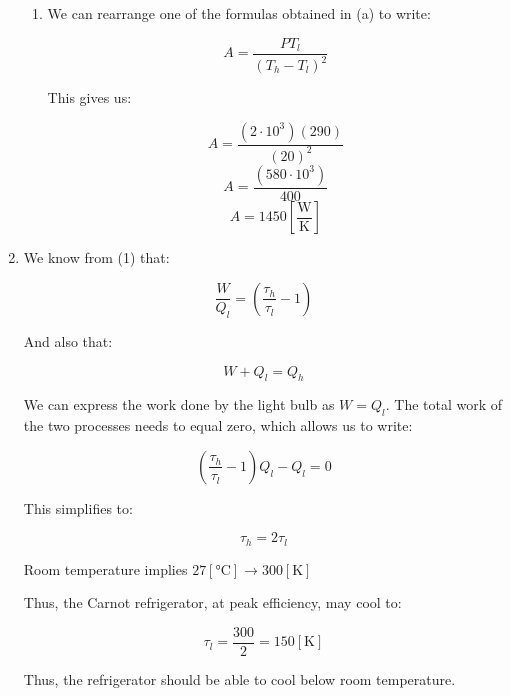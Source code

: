 \begin{enumerate}
\begin{enumerate}
      \item 

        We can rearrange one of the formulas obtained in (a) to write:

        $$A=\frac{PT_l}{\left( T_h-T_l \right)^2}$$

        This gives us:

        $$A=\frac{(2\cdot10^3)(290)}{(20)^2}$$
        $$A=\frac{(580\cdot10^3)}{400}$$
        $$\boxed{A=1450\left[ \frac{\si{\watt}}{\si{\kelvin}} \right]}$$

    \end{enumerate}

  \item

    We know from (1) that:

    $$\frac{W}{Q_l}=\left( \frac{\tau_h}{\tau_l}-1 \right)$$

    And also that:

    $$W+Q_l=Q_h$$

    We can express the work done by the light bulb as $W=Q_l$. The total work of the two processes needs to equal zero, which allows us to write:

    $$\left( \frac{\tau_h}{\tau_l}-1 \right)Q_l-Q_l=0$$

    This simplifies to:

    $$\tau_h=2\tau_l$$

    Room temperature implies $27[\si{\celsius}]\to300[\si{\kelvin}]$

    Thus, the Carnot refrigerator, at peak efficiency, may cool to:

    $$\boxed{\tau_l=\frac{300}{2}=150[\si{\kelvin}]}$$

    Thus, the refrigerator should be able to cool below room temperature.

\end{enumerate}




